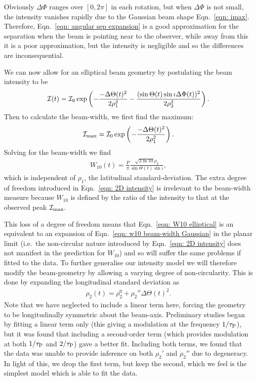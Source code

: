 \documentclass[../full_thesis/full_thesis.tex]{subfiles}
\begin{document}
Obviously $\Delta\Phi$ ranges over $[0,2\pi]$ in each rotation, but when
$\Delta\Phi$ is not small, the intensity vanishes rapidly due to the Gaussian
beam shape Eqn.~\eqref{eqn: imax}.  Therefore, Eqn.~\eqref{eqn: angular sep
expansion} is a good approximation for the separation when the beam is pointing
near to the observer, while away from this it is a poor approximation, but the
intensity is negligible and so the differences are inconsequential.

We can now allow for an elliptical beam geometry by postulating the beam
intensity to be
\begin{align}
\mathcal{I}(t) = \mathcal{I}_{0} \exp\left(
-\frac{-\Delta\Theta(t)^{2}}{2\rho_1^{2}}
-\frac{(\sin\Theta(t)\sin\iota\Delta\Phi(t))^{2}}{2\rho_2^{2}}
\right).
\label{eqn: 2D intensity}
\end{align}
Then to calculate the beam-width, we first find the maximum:
\begin{align}
\mathcal{I}_\textrm{max} = \mathcal{I}_{0} \exp\left(
-\frac{-\Delta\Theta(t)^{2}}{2\rho_1^{2}}
\right).
\end{align}
Solving for the beam-width we find
\begin{align}
W_{10}(t) = \frac{P}{\pi}\frac{\sqrt{2\ln10}\rho_{2}}{\sin\Theta(t)\sin\iota},
\label{eqn: W10 elliptical}
\end{align}
which is independent of $\rho_1$, the latitudinal standard-deviation. The extra
degree of freedom introduced in Eqn.~\eqref{eqn: 2D intensity} is irrelevant to
the beam-width measure because $W_{10}$ is defined by the ratio of the
intensity to that at the observed peak $\mathcal{I}_{\textrm{max}}$.

This loss of a degree of freedom means that Eqn.~\eqref{eqn: W10 elliptical} is
an equivalent to an expansion of Eqn.~\eqref{eqn: w10 beam-width Gaussian} in
the planar limit (i.e.\ the non-circular nature introduced by Eqn.~\eqref{eqn: 2D intensity}
does not manifest in the prediction for $W_{10}$)
and so will suffer the same problems if fitted to the data. To further
generalise our intensity model we will therefore modify the beam-geometry by
allowing a varying degree of  non-circularity. This is done by expanding the
longitudinal standard deviation as
\begin{align}
\rho_{2}(t) = \rho_2^{0} + \rho_2'' \Delta\Theta(t)^{2}.
\label{eqn: rho2}
\end{align}
Note that we have neglected to include a linear term here, forcing the geometry
to be longitudinally symmetric about the beam-axis. Preliminary studies began
by fitting a linear term only (this giving a modulation at the frequency
$1/\tau_{\mathrm{P}}$), but it was found that including a second-order term (which provides
modulation at both $1/\tau_{\mathrm{P}}$ and $2/\tau_{\mathrm{P}}$) gave a better fit. Including both
terms, we found that the data was unable to provide inference on both $\rho_2'$
and $\rho_2''$ due to degeneracy. In light of this, we drop the first
term, but keep the second, which we feel is the simplest model which is able to
fit the data.
\end{document}
